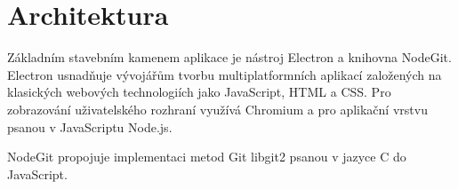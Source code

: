 \chapter{Architektura}
Základním stavebním kamenem aplikace je nástroj Electron a knihovna NodeGit.
Electron usnadňuje vývojářům tvorbu multiplatformních aplikací založených na klasických webových technologiích jako JavaScript, HTML a CSS.
Pro zobrazování uživatelského rozhraní využívá Chromium a pro aplikační vrstvu psanou v JavaScriptu Node.js.

NodeGit propojuje implementaci metod Git libgit2 psanou v jazyce C do JavaScript.
